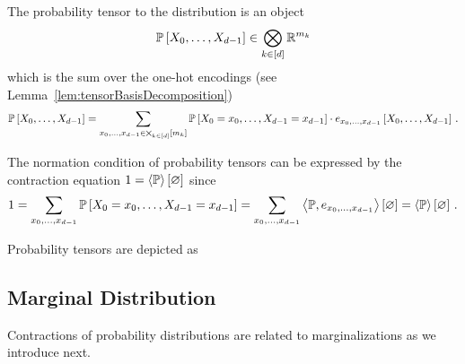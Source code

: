 The probability tensor to the distribution is an object
		\[ \mathbb{P}\left[X_{0},\ldots,X_{d-1}\right] \in \bigotimes_{k\in[d]}\mathbb{R}^{m_{k}} \]
which is the sum over the one-hot encodings (see Lemma~\ref{lem:tensorBasisDecomposition})
		\[ \mathbb{P}\left[X_{0},\ldots,X_{d-1}\right] = \sum_{x_{0},\ldots,x_{d-1}\in\bigtimes_{k\in[d]}[m_{k}]} \mathbb{P}\left[X_{0}=x_{0},\ldots,X_{d-1}=x_{d-1}\right] \cdot e_{x_{0},\ldots,x_{d-1}}\left[X_{0},\ldots,X_{d-1}\right] \, . \]
		
The normation condition of probability tensors can be expressed by the contraction equation $1= \left\langle \mathbb{P}\right\rangle \left[ \varnothing \right]$ since
\begin{align*}
	1 = \sum_{x_{0},\ldots,x_{d-1}}\mathbb{P}\left[X_{0}=x_{0},\ldots,X_{d-1}=x_{d-1}\right]
	=  \sum_{x_{0},\ldots,x_{d-1}}\left\langle \mathbb{P}, e_{x_{0},\ldots,x_{d-1}}\right\rangle \left[ \varnothing \right]
	= \left\langle \mathbb{P}\right\rangle \left[ \varnothing \right] \, . 
\end{align*}



Probability tensors are depicted as
\begin{center}
	
\end{center}


\subsection{Marginal Distribution}

Contractions of probability distributions are related to marginalizations as we introduce next.

